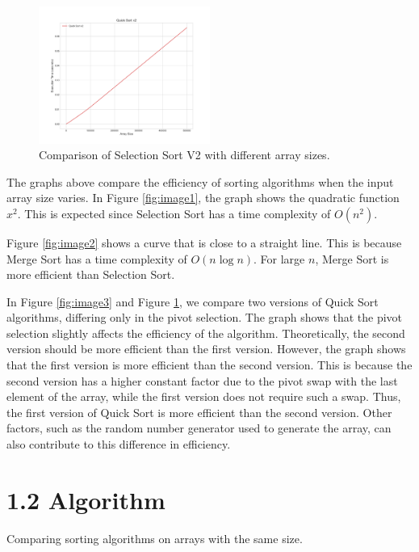 \documentclass[12pt, letterpaper]{report}
\begin{document}
\begin{figure}[htbp]
    \centering
    \includegraphics[width=0.5\textwidth]{"../img/a_quick_sort_v2.png"}
    \caption{Comparison of Selection Sort V2 with different array sizes.}
    \label{fig:image4}
\end{figure}

\clearpage

The graphs above compare the efficiency of sorting algorithms when the input array size varies. In Figure \ref{fig:image1}, the graph shows the quadratic function $x^2$. This is expected since Selection Sort has a time complexity of $O(n^2)$.

\par\medskip

Figure \ref{fig:image2} shows a curve that is close to a straight line. This is because Merge Sort has a time complexity of $O(n \log n)$. For large \(n\), Merge Sort is more efficient than Selection Sort.

\par\medskip

In Figure \ref{fig:image3} and Figure \ref{fig:image4}, we compare two versions of Quick Sort algorithms, differing only in the pivot selection. The graph shows that the pivot selection slightly affects the efficiency of the algorithm. Theoretically, the second version should be more efficient than the first version. However, the graph shows that the first version is more efficient than the second version. This is because the second version has a higher constant factor due to the pivot swap with the last element of the array, while the first version does not require such a swap. Thus, the first version of Quick Sort is more efficient than the second version. Other factors, such as the random number generator used to generate the array, can also contribute to this difference in efficiency.

\clearpage

\section*{1.2 Algorithm}
Comparing sorting algorithms on arrays with the same size.
\end{document}
